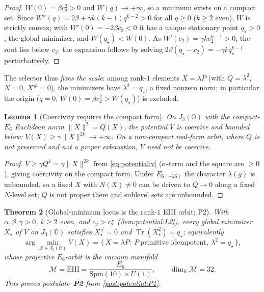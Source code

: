 \documentclass[11pt]{article}
\theoremstyle{plain}
\newtheorem{theorem}{Theorem}[section]
\newtheorem{lemma}[theorem]{Lemma}
\theoremstyle{definition}
\theoremstyle{remark}
\begin{document}
\begin{proof}
$W(0)=\beta c_2^2>0$ and $W(q)\to+\infty$, so a minimum exists on a compact set. Since
$W''(q)=2\beta+\gamma k(k-1)q^{k-2}>0$ for all $q\ge0$ ($k\ge2$ even), $W$ is strictly convex;
with $W'(0)=-2\beta c_2<0$ it has a unique stationary point $q_\star>0$, the global minimizer,
and $W(q_\star)<W(0)$. As $W'(c_2)=\gamma k c_2^{k-1}>0$, the root lies below $c_2$; the
expansion follows by solving $2\beta(q_\star-c_2)=-\gamma k q_\star^{k-1}$ perturbatively.
\end{proof}

The selector thus \emph{fixes the scale}: among rank-$1$ elements $X=\lambda P$ (with
$Q=\lambda^2$, $N=0$, $X^\#=0$), the minimizers have $\lambda^2=q_\star$, a fixed nonzero
norm; in particular the origin ($q=0$, $W(0)=\beta c_2^2>W(q_\star)$) is excluded.

\begin{lemma}[Coercivity requires the compact form]
\label{lem:potential:L3}
On $J_3(\mathbb O)$ with the compact-$E_6$ Euclidean norm $\|X\|^2=Q(X)$, the potential $V$ is
coercive and bounded below: $V(X)\ge\gamma\|X\|^{2k}\to+\infty$. On a non-compact real-form
orbit, where $Q$ is not preserved and not a proper exhaustion, $V$ need not be coercive.
\end{lemma}

\begin{proof}
$V\ge\gamma Q^k=\gamma\|X\|^{2k}$ from \eqref{eq:potential:v} ($\alpha$-term and the square
are $\ge0$), giving coercivity on the compact form. Under $E_{6(-26)}$ the character
$\lambda(g)$ is unbounded, so a fixed $X$ with $N(X)\neq0$ can be driven to $Q\to0$ along a
fixed $N$-level set; $Q$ is not proper there and sublevel sets are unbounded.
\end{proof}

\begin{theorem}[Global-minimum locus is the rank-$1$ EIII orbit; P2]
\label{thm:potential:T4}
\label{thm:pot:vacuum}
\label{thm:potential:vacuum}
\label{thm:vacuum:T4}
\label{thm:ExplicitBreaking}
\label{cor:VacuumManifold}
\label{cor:VacuumOrbit}
With $\alpha,\beta,\gamma>0$, $k\ge2$ even, and $c_2>c_2^{\,\star}$
(\autoref{lem:potential:L2}), every global minimizer $X_\star$ of $V$ on $J_3(\mathbb O)$
satisfies $X_\star^\#=0$ and $\operatorname{Tr}(X_\star^2)=q_\star$; equivalently
\begin{equation}
\label{eq:potential:argmin}
\arg\min_{X\in J_3(\mathbb O)}V(X)
=\{\,X=\lambda P:\ P\ \text{primitive idempotent},\ \lambda^2=q_\star\,\},
\end{equation}
whose projective $E_6$-orbit is the vacuum manifold
\begin{equation}
\label{eq:potential:vacuum}
\mathcal M=\mathrm{EIII}=\frac{E_6}{\mathrm{Spin}(10)\times U(1)},
\qquad \dim_{\mathbb R}\mathcal M=32.
\end{equation}
This proves postulate~\textbf{P2} from \autoref{post:potential:P1}.
\end{theorem}
\end{document}
